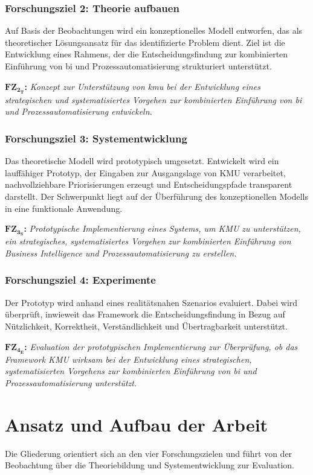 \subsubsection*{Forschungsziel 2: Theorie aufbauen}
Auf Basis der Beobachtungen wird ein konzeptionelles Modell entworfen, das als theoretischer Lösungsansatz für das identifizierte Problem dient. Ziel ist die Entwicklung eines Rahmens, der die Entscheidungsfindung zur kombinierten Einführung von \gls{bi} und Prozessautomatisierung strukturiert unterstützt. 

\textbf{$\textbf{FZ}_{\textbf{2}_\textbf{T}}$:} \emph{Konzept zur Unterstützung von \gls{kmu} bei der Entwicklung eines strategischen und systematisiertes Vorgehen zur kombinierten Einführung von \gls{bi} und Prozessautomatisierung entwickeln.}

\subsubsection*{Forschungsziel 3: Systementwicklung}
Das theoretische Modell wird prototypisch umgesetzt. Entwickelt wird ein lauffähiger Prototyp, der Eingaben zur Ausgangslage von KMU verarbeitet, nachvollziehbare Priorisierungen erzeugt und Entscheidungspfade transparent darstellt. Der Schwerpunkt liegt auf der Überführung des konzeptionellen Modells in eine funktionale Anwendung.

\textbf{$\textbf{FZ}_{\textbf{3}_\textbf{S}}$:} \emph{Prototypische Implementierung eines Systems, um KMU zu unterstützen, ein strategisches, systematisiertes Vorgehen zur kombinierten Einführung von Business Intelligence und Prozessautomatisierung zu erstellen.}

\subsubsection*{Forschungsziel 4: Experimente}
Der Prototyp wird anhand eines realitätsnahen Szenarios evaluiert. Dabei wird überprüft, inwieweit das Framework die Entscheidungsfindung in Bezug auf Nützlichkeit, Korrektheit, Verständlichkeit und Übertragbarkeit unterstützt. 

\textbf{$\textbf{FZ}_{\textbf{4}_\textbf{E}}$:} \emph{Evaluation der prototypischen Implementierung zur Überprüfung, ob das Framework KMU wirksam bei der Entwicklung eines strategischen, systematisierten Vorgehens zur kombinierten Einführung von \gls{bi} und Prozessautomatisierung unterstützt.}


\section{Ansatz und Aufbau der Arbeit}\label{sec:ansatzUndAufbauDerArbeit}
Die Gliederung orientiert sich an den vier Forschungszielen und führt von der Beobachtung über die Theoriebildung und Systementwicklung zur Evaluation.

